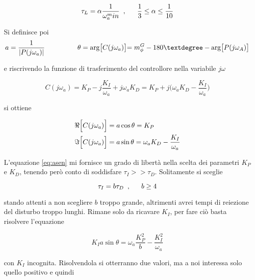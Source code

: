 		\begin{equation}
			\tau_L=\alpha\frac{1}{\omega_a^min} \singleSpacing, \trippleSpacing \frac{1}{3}\le\alpha\le\frac{1}{10}
			\label{eq:tauL}
		\end{equation}
		
		\noindent Si definisce poi 
		\begin{equation}
			a=\frac{1}{|P(j\omega_a)|} \trippleSpacing \trippleSpacing \trippleSpacing \theta=\arg\bigl[C(j\omega_a)\bigl]=m_{\phi}^G-180°-\arg\bigl[P(j\omega_A)\bigl]
		\end{equation}
	
		\noindent e riscrivendo la funzione di trasferimento del controllore nella variabile $j\omega$
		
		\begin{equation}
			C(j\omega_a)=K_P-j\frac{K_I}{\omega_a}+j\omega_aK_D=K_P+j\bigl(\omega_aK_D-\frac{K_I}{\omega_a}\bigl)
		\end{equation}
		
		\noindent si ottiene
		
		\begin{align}
			\Re\Bigl[C(j\omega_a)\Bigl] &= a\cos\theta=K_P \\
			\Im\Bigl[C(j\omega_a)\Bigl] &= a\sin\theta=\omega_aK_D-\frac{K_I}{\omega_a}
			\label{eq:asen}
		\end{align}
	
		\noindent L'equazione \ref{eq:asen} mi fornisce un grado di libertà nella scelta dei parametri $K_P$ e $K_D$, tenendo però conto di soddisfare $\tau_I>>\tau_D$. Solitamente si sceglie 
		
		\begin{equation}
			\tau_I=b\tau_D \singleSpacing, \trippleSpacing b\ge4
		\end{equation}
	
		\noindent stando attenti a non scegliere $b$ troppo grande, altrimenti avrei tempi di reiezione del disturbo troppo lunghi. Rimane solo da ricavare $K_I$, per fare ciò basta risolvere l'equazione
		
		\begin{equation}
			K_Ia\sin\theta=\omega_a\frac{K_P^2}{b}-\frac{K_I^2}{\omega_a}
		\end{equation}
	
		\noindent con $K_I$ incognita. Risolvendola si otterranno due valori, ma a noi interessa solo quello positivo e quindi
		
